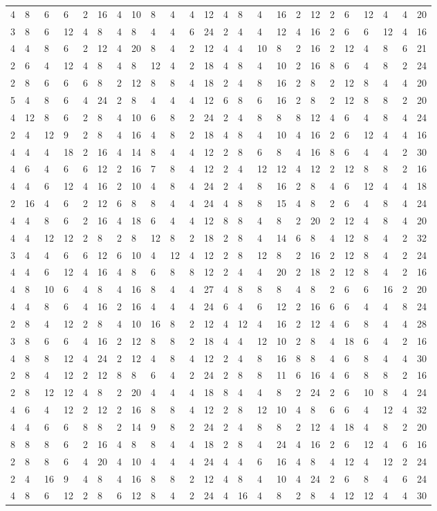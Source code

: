 \begin{longtable}{*{24}{l}}
4&8&6&6&2&16&4&10&8&4&4&12&4&8&4&16&2&12&2&6&12&4&4&20\\
3&8&6&12&4&8&4&8&4&4&6&24&2&4&4&12&4&16&2&6&6&12&4&16\\
4&4&8&6&2&12&4&20&8&4&2&12&4&4&10&8&2&16&2&12&4&8&6&21\\
2&6&4&12&4&8&4&8&12&4&2&18&4&8&4&10&2&16&8&6&4&8&2&24\\
2&8&6&6&6&8&2&12&8&8&4&18&2&4&8&16&2&8&2&12&8&4&4&20\\
5&4&8&6&4&24&2&8&4&4&4&12&6&8&6&16&2&8&2&12&8&8&2&20\\
4&12&8&6&2&8&4&10&6&8&2&24&2&4&8&8&8&12&4&6&4&8&4&24\\
2&4&12&9&2&8&4&16&4&8&2&18&4&8&4&10&4&16&2&6&12&4&4&16\\
4&4&4&18&2&16&4&14&8&4&4&12&2&8&6&8&4&16&8&6&4&4&2&30\\
4&6&4&6&6&12&2&16&7&8&4&12&2&4&12&12&4&12&2&12&8&8&2&16\\
4&4&6&12&4&16&2&10&4&8&4&24&2&4&8&16&2&8&4&6&12&4&4&18\\
2&16&4&6&2&12&6&8&8&4&4&24&4&8&8&15&4&8&2&6&4&8&4&24\\
4&4&8&6&2&16&4&18&6&4&4&12&8&8&4&8&2&20&2&12&4&8&4&20\\
4&4&12&12&2&8&2&8&12&8&2&18&2&8&4&14&6&8&4&12&8&4&2&32\\
3&4&4&6&6&12&6&10&4&12&4&12&2&8&12&8&2&16&2&12&8&4&2&24\\
4&4&6&12&4&16&4&8&6&8&8&12&2&4&4&20&2&18&2&12&8&4&2&16\\
4&8&10&6&4&8&4&16&8&4&4&27&4&8&8&8&4&8&2&6&6&16&2&20\\
4&4&8&6&4&16&2&16&4&4&4&24&6&4&6&12&2&16&6&6&4&4&8&24\\
2&8&4&12&2&8&4&10&16&8&2&12&4&12&4&16&2&12&4&6&8&4&4&28\\
3&8&6&6&4&16&2&12&8&8&2&18&4&4&12&10&2&8&4&18&6&4&2&16\\
4&8&8&12&4&24&2&12&4&8&4&12&2&4&8&16&8&8&4&6&8&4&4&30\\
2&8&4&12&2&12&8&8&6&4&2&24&2&8&8&11&6&16&4&6&8&8&2&16\\
2&8&12&12&4&8&2&20&4&4&4&18&8&4&4&8&2&24&2&6&10&8&4&24\\
4&6&4&12&2&12&2&16&8&8&4&12&2&8&12&10&4&8&6&6&4&12&4&32\\
4&4&6&6&8&8&2&14&9&8&2&24&2&4&8&8&2&12&4&18&4&8&2&20\\
8&8&8&6&2&16&4&8&8&4&4&18&2&8&4&24&4&16&2&6&12&4&6&16\\
2&8&8&6&4&20&4&10&4&4&4&24&4&4&6&16&4&8&4&12&4&12&2&24\\
2&4&16&9&4&8&4&16&8&8&2&12&4&8&4&10&4&24&2&6&8&4&6&24\\
4&8&6&12&2&8&6&12&8&4&2&24&4&16&4&8&2&8&4&12&12&4&4&30\\
\bottomrule\end{longtable}
